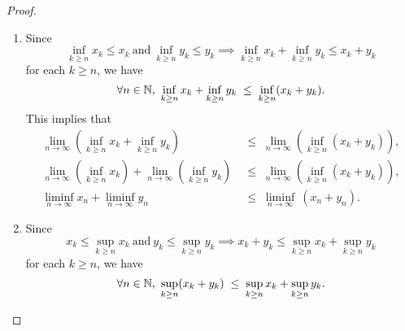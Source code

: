 \documentclass[11pt,openany]{article}
\begin{document}
\begin{proof}
\begin{enumerate}[(1)]
	\item Since \[
	\inf\limits_{k\geq n}x_k\leq x_k\ \text{and}\ \inf\limits_{k\geq n}y_k\leq y_k\implies
	\inf\limits_{k\geq n}x_k+\inf\limits_{k\geq n}y_k\leq x_k+ y_k
	\] for each $k\geq n$, we have \[
	\forall n\in\mathbb{N},\ \inf\limits_{k\geq n}x_k+\inf\limits_{k\geq n}y_k \;\leq\; \inf\limits_{k\geq n}(x_k+y_k).
	\] This implies that \begin{align*}
		\lim\limits_{n \to \infty}\left(\inf\limits_{k\geq n}x_k+\inf\limits_{k\geq n}y_k\right) \;&\leq\; \lim\limits_{n \to \infty}\left(\inf\limits_{k\geq n}(x_k+y_k)\right),\\
		\lim\limits_{n \to \infty}\left(\inf\limits_{k\geq n}x_k\right)+\lim\limits_{n \to \infty}\left(\inf\limits_{k\geq n}y_k\right) \;&\leq\; \lim\limits_{n \to \infty}\left(\inf\limits_{k\geq n}(x_k+y_k)\right),\\
		\liminf\limits_{n \to \infty}x_n+\liminf\limits_{n \to \infty}y_n \;&\leq\; \liminf\limits_{n \to \infty}\ (x_n+y_n).
	\end{align*}
	\item Since \[
	x_k\leq \sup\limits_{k\geq n}x_k\ \text{and}\ y_k\leq \sup\limits_{k\geq n}y_k\implies
	x_k+ y_k\leq\sup\limits_{k\geq n}x_k+\sup\limits_{k\geq n}y_k 
	\] for each $k\geq n$, we have \[
	\forall n\in\mathbb{N},\ \sup\limits_{k\geq n}(x_k+y_k) \;\leq\; \sup\limits_{k\geq n}x_k+\sup\limits_{k\geq n}y_k.
\]
\end{enumerate}
\end{proof}
\end{document}

